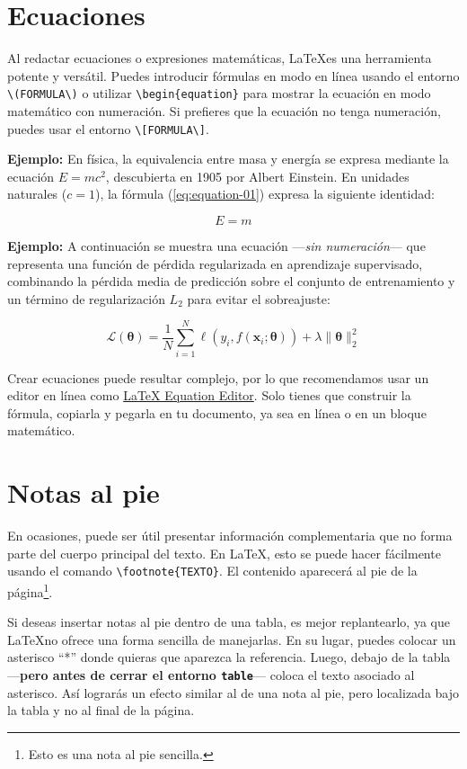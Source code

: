 \section{Ecuaciones}

Al redactar ecuaciones o expresiones matemáticas, \LaTeX es una herramienta potente y versátil. Puedes introducir fórmulas en modo en línea usando el entorno \verb|\(FORMULA\)| o utilizar \verb|\begin{equation}| para mostrar la ecuación en modo matemático con numeración. Si prefieres que la ecuación no tenga numeración, puedes usar el entorno \verb|\[FORMULA\]|.

\vspace{.875em}
\textbf{Ejemplo:} En física, la equivalencia entre masa y energía se expresa mediante la ecuación \(E=mc^2\), descubierta en 1905 por Albert Einstein. En unidades naturales ($c = 1$), la fórmula (\ref{eq:equation-01}) expresa la siguiente identidad:

\begin{equation}
\label{eq:equation-01}
E = m
\end{equation}

\textbf{Ejemplo:} A continuación se muestra una ecuación —\textit{sin numeración}— que representa una función de pérdida regularizada en aprendizaje supervisado, combinando la pérdida media de predicción sobre el conjunto de entrenamiento y un término de regularización $L_2$ para evitar el sobreajuste:

\[
\mathcal{L}(\boldsymbol{\theta}) = \frac{1}{N} \sum_{i=1}^{N} \ell(y_i, f(\mathbf{x}_i; \boldsymbol{\theta})) + \lambda \|\boldsymbol{\theta}\|_2^2
\]

Crear ecuaciones puede resultar complejo, por lo que recomendamos usar un editor en línea como \href{https://latexeditor.lagrida.com/}{LaTeX Equation Editor}. Solo tienes que construir la fórmula, copiarla y pegarla en tu documento, ya sea en línea o en un bloque matemático.

\section{Notas al pie}

En ocasiones, puede ser útil presentar información complementaria que no forma parte del cuerpo principal del texto. En \LaTeX, esto se puede hacer fácilmente usando el comando \verb|\footnote{TEXTO}|. El contenido aparecerá al pie de la página\footnote{Esto es una nota al pie sencilla.}.

Si deseas insertar notas al pie dentro de una tabla, es mejor replantearlo, ya que \LaTeX no ofrece una forma sencilla de manejarlas. En su lugar, puedes colocar un asterisco “*” donde quieras que aparezca la referencia. Luego, debajo de la tabla —\textbf{pero antes de cerrar el entorno \texttt{table}}— coloca el texto asociado al asterisco. Así lograrás un efecto similar al de una nota al pie, pero localizada bajo la tabla y no al final de la página.
